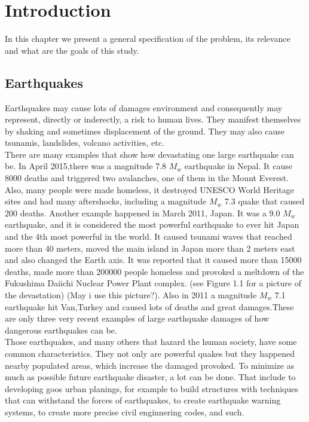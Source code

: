 \chapter{Introduction}
In this chapter we present a general specification of the problem, its relevance and what are the goals of this study.

\section{Earthquakes}
Earthquakes may cause lots of damages environment and consequently may represent, directly or inderectly, a risk to human lives. They manifest themselves by shaking and sometimes displacement of the ground. They may also cause tsunamis, landslides, volcano activities, etc.\\

There are many examples that show how devastating one large earthquake can be. In April 2015,there was a magnitude 7.8 $M_w$ earthquake in Nepal. It cause 8000 deaths and triggered two avalanches, one of them in the Mount Everest. Also, many people were made homeless, it destroyed UNESCO World Heritage sites and had many aftershocks, including a magnitude $M_w$ 7.3 quake that caused 200 deaths. Another example happened in March 2011, Japan. It was a 9.0 $M_w$ earthquake, and it is considered the most powerful earthquake to ever hit Japan and the 4th most powerful in the world. It caused tsunami waves that reached more than 40 meters, moved the main island in Japan more than 2 meters east and also changed the Earth axis. It was reported that it caused more than 15000 deaths, made more than 200000 people homeless and provoked a meltdown of the Fukushima Daiichi Nuclear Power Plant complex. (see Figure 1.1 for a picture of the devastation) (May i use this picture?). Also in 2011 a magnitude $M_w$ 7.1 earthquake hit Van,Turkey and caused lots of deaths and great damages.These are only three very recent examples of large earthquake damages of how dangerous earthquakes can be.\\

Those earthquakes, and many others that hazard the human society, have some common characteristics. They not only are powerful quakes but they happened nearby populated areas, which increase the damaged provoked. To minimize as much as possible future earthquake disaster, a lot can be done. That include to developing goos urban planings, for example to build structures with techniques that can withstand the forces of earthquakes, to create earthquake warning systems, to create more precise civil enginnering codes, and such.\\

